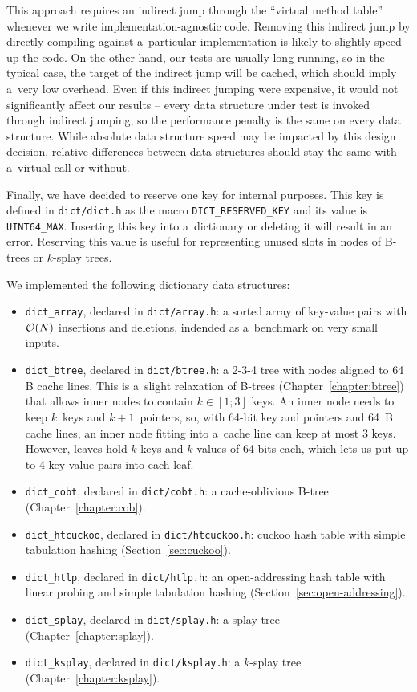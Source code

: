 This approach requires an indirect jump through the ``virtual method table''
whenever we write implementation-agnostic code. Removing this indirect jump
by directly compiling against a~particular implementation is likely to slightly
speed up the code. On the other hand, our tests are usually long-running, so in
the typical case, the target of the indirect jump will be cached, which should
imply a~very low overhead. Even if this indirect jumping were expensive, it
would not significantly affect our results -- every data structure under test
is invoked through indirect jumping, so the performance penalty is the same
on every data structure. While absolute data structure speed may be impacted
by this design decision, relative differences between data structures should
stay the same with a~virtual call or without.

Finally, we have decided to reserve one key for internal purposes.
This key is defined in \texttt{dict/dict.h} as the macro
\texttt{DICT\_RESERVED\_KEY} and its value is \texttt{UINT64\_MAX}.
Inserting this key into a~dictionary or deleting it will result in an error.
Reserving this value is useful for representing unused slots in nodes of
\mbox{B-trees} or $k$-splay trees.

We implemented the following dictionary data structures:
\begin{itemize}
\item \texttt{dict\_array}, declared in \texttt{dict/array.h}:
	a sorted array of key-value pairs with $\mathcal{O}(N)$ insertions and deletions,
	indended as a~benchmark on very small inputs.
\item \texttt{dict\_btree}, declared in \texttt{dict/btree.h}:
	a 2-3-4 tree with nodes aligned to 64 B cache lines.
	This is a~slight relaxation of B-trees (Chapter~\ref{chapter:btree})
	that allows inner nodes to contain $k\in[1;3]$ keys.
	An inner node needs to keep $k$~keys and $k+1$~pointers, so, with
	64-bit key and pointers and 64~B cache lines, an inner node fitting
	into a~cache line can keep at most 3 keys. However, leaves hold $k$
	keys and $k$ values of 64 bits each, which lets us put up to
	4 key-value pairs into each leaf.
\item \texttt{dict\_cobt}, declared in \texttt{dict/cobt.h}:
	a cache-oblivious B-tree (Chapter~\ref{chapter:cob}).
\item \texttt{dict\_htcuckoo}, declared in \texttt{dict/htcuckoo.h}:
	cuckoo hash table with simple tabulation hashing
	(Section~\ref{sec:cuckoo}).
\item \texttt{dict\_htlp}, declared in \texttt{dict/htlp.h}:
	an open-addressing hash table with linear probing and simple tabulation
	hashing (Section~\ref{sec:open-addressing}).
\item \texttt{dict\_splay}, declared in \texttt{dict/splay.h}:
	a splay tree (Chapter~\ref{chapter:splay}).
\item \texttt{dict\_ksplay}, declared in \texttt{dict/ksplay.h}:
	a $k$-splay tree (Chapter~\ref{chapter:ksplay}). %
\end{itemize}

